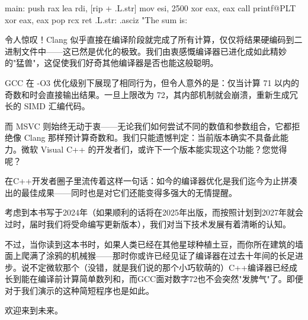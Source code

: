\begin{shell}
main:
  push rax
  lea rdi, [rip + .L.str]
  mov esi, 2500
  xor eax, eax
  call printf@PLT
  xor eax, eax
  pop rcx
  ret
.L.str:
  .asciz "The sum is: %
\end{shell}

令人惊叹！Clang 似乎直接在编译阶段就完成了所有计算，仅仅将结果硬编码到二进制文件中——这已然是优化的极致。我们由衷感慨编译器已进化成如此精妙的"猛兽"，这促使我们好奇其他编译器是否也能这般聪明。

GCC 在 -O3 优化级别下展现了相同行为，但令人意外的是：仅当计算 71 以内的奇数和时会直接输出结果。一旦上限改为 72，其内部机制就会崩溃，重新生成冗长的 SIMD 汇编代码。

而 MSVC 则始终无动于衷——无论我们如何尝试不同的数值和参数组合，它都拒绝像 Clang 那样预计算奇数和。我们只能遗憾判定：当前版本确实不具备此能力。微软 Visual C++ 的开发者们，或许下一个版本能实现这个功能？您觉得呢？


在C++开发者圈子里流传着这样一句话：如今的编译器优化是我们迄今为止拼凑出的最佳成果——同时也是对它们还能变得多强大的无情提醒。

考虑到本书写于2024年（如果顺利的话将在2025年出版，而按照计划到2027年就会过时，届时我们将受命编写更新版本），我们对当下技术发展有着清晰的认知。

不过，当你读到这本书时，如果人类已经在其他星球种植土豆，而你所在建筑的墙面上爬满了涂鸦的机械猴——那时你或许已经见证了编译器在过去十年间的长足进步。说不定微软那个（没错，就是我们说的那个小巧软萌的）C++编译器已经成长到能在编译前计算简单数列和，而GCC面对数字72也不会突然"发脾气"了。即便对于我们演示的这种简短程序也是如此。

欢迎来到未来。








